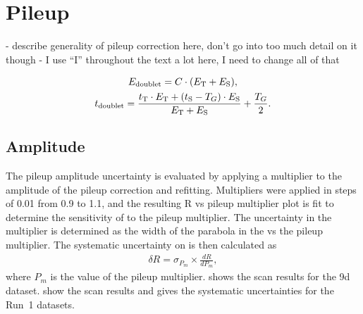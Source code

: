 
\graphicspath{{Body/Figures/Pileup/}{Body/Figures/Pileup/Amplitude/}{Body/Figures/Pileup/TimeShift/}{Body/Figures/Pileup/EnergyModel/}{Body/Figures/Pileup/TriplePileup/}{Body/Figures/Pileup/RateError/}}

\section{Pileup}


- describe generality of pileup correction here, don't go into too much detail on it though
- I use ``I'' throughout the text a lot here, I need to change all of that



         \begin{gather}
            E_{\text{doublet}} = C \cdot (E_{\rm T} + E_{\rm S}), \label{eq:Edoublet} \\
            t_{\text{doublet}} = \frac{t_{\rm T} \cdot E_{\rm T} + (t_{\rm S}-T_{G}) \cdot E_{\rm S}}{E_{\rm T} + E_{\rm S}} + \frac{T_{G}}{2}. \label{eq:tdoublet}
        \end{gather}



\subsection{Amplitude}

The pileup amplitude uncertainty is evaluated by applying a multiplier to the amplitude of the pileup correction and refitting. Multipliers were applied in steps of 0.01 from 0.9 to 1.1, and the resulting R vs pileup multiplier plot is fit to determine the sensitivity of \R to the pileup multiplier. The uncertainty in the multiplier is determined as the width of the parabola in the \chisq vs the pileup multiplier. The systematic uncertainty on \R is then calculated as 
    \begin{align}
        \delta R = \sigma_{P_{m}} \times \frac{dR}{dP_{m}},
    \end{align}
where $P_{m}$ is the value of the pileup multiplier.  shows the scan results for the 9d dataset.  show the scan results and  gives the systematic uncertainties for the Run~1 datasets.





